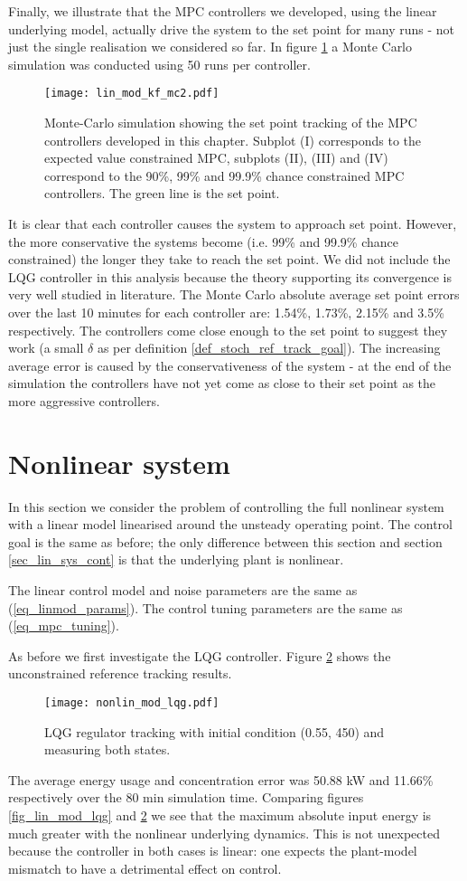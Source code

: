 Finally, we illustrate that the MPC controllers we developed, using the linear underlying model, actually drive the system to the set point for many runs - not just the single realisation we considered so far. In figure \ref{fig_lin_mod_kf_mc2} a Monte Carlo simulation was conducted using 50 runs per controller.
\begin{figure}[H] 
\centering
\texttt{[image: lin\_mod\_kf\_mc2.pdf]}
\caption{Monte-Carlo simulation showing the set point tracking of the MPC controllers developed in this chapter. Subplot (I) corresponds to the expected value constrained MPC, subplots (II), (III) and (IV) correspond to the 90\%, 99\% and 99.9\% chance constrained MPC controllers. The green line is the set point.}
\label{fig_lin_mod_kf_mc2}
\end{figure}
It is clear that each controller causes the system to approach set point. However, the more conservative the systems become (i.e. 99\% and 99.9\% chance constrained) the longer they take to reach the set point. We did not include the LQG controller in this analysis because the theory supporting its convergence is very well studied in literature. The Monte Carlo absolute average set point errors over the last 10 minutes for each controller are: 1.54\%, 1.73\%, 2.15\% and 3.5\% respectively. The controllers come close enough to the set point to suggest they work (a small $\delta$ as per definition \ref{def_stoch_ref_track_goal}). The increasing average error is caused by the conservativeness of the system - at the end of the simulation the controllers have not yet come as close to their set point as the more aggressive controllers. 

\section{Nonlinear system}
\label{sec_nonlinear_control}
In this section we consider the problem of controlling the full nonlinear system with a linear model linearised around the unsteady operating point. The control goal is the same as before; the only difference between this section and section \ref{sec_lin_sys_cont} is that the underlying plant is nonlinear.

The linear control model and noise parameters are the same as (\ref{eq_linmod_params}). The control tuning parameters are the same as (\ref{eq_mpc_tuning}).

As before we first investigate the LQG controller. Figure \ref{fig_nonlin_lqg} shows the unconstrained reference tracking results.
\begin{figure}[H] 
\centering
\texttt{[image: nonlin\_mod\_lqg.pdf]}
\caption{LQG regulator tracking with initial condition (0.55, 450) and measuring both states.}
\label{fig_nonlin_lqg}
\end{figure}
The average energy usage and concentration error was 50.88 kW and 11.66\% respectively over the 80 min simulation time. Comparing figures \ref{fig_lin_mod_lqg} and \ref{fig_nonlin_lqg} we see that the maximum absolute input energy is much greater with the nonlinear underlying dynamics. This is not unexpected because the controller in both cases is linear: one expects the plant-model mismatch to have a detrimental effect on control.

